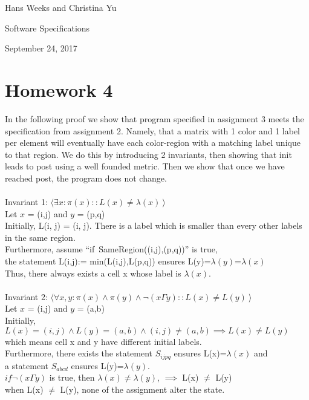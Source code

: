 \documentclass{article}
\begin{document}
\hfill Hans Weeks and Christina Yu

\hfill Software Specifications

\hfill September 24, 2017
\section*{Homework 4}
In the following proof we show that program specified in assignment 3 meets the specification from assignment 2. Namely, that a matrix with 1 color and 1 label per element will eventually have each color-region with a matching label unique to that region. We do this by introducing 2 invariants, then showing that init leads to post using a well founded metric. Then we show that once we have reached post, the program does not change.\\
\\
Invariant 1: $\langle \exists x: \pi(x) :: L(x) \neq \lambda(x) \ \rangle$ \\
Let $x$ = (i,j)  and $y$ = (p,q)\\
Initially, L(i, j) = (i, j). There is a label which is smaller than every other labels in the same region.\\
Furthermore, assume ``if\ SameRegion((i,j),(p,q))'' is true,\\
the statement L(i,j):= min(L(i,j),L(p,q)) ensures L(y)=$\lambda(y)$=$\lambda(x)$\\
Thus, there always exists a cell x whose label is $\lambda(x)$.\\
\\
Invariant 2: $\langle \forall x,y: \pi(x) \wedge \pi(y) \wedge \neg(x \Gamma y) :: L(x) \neq L(y) \ \rangle$ \\
Let $x$ = (i,j)  and $y$ = (a,b)\\
Initially, $L(x) = (i,j) \wedge L(y) = (a,b) \wedge (i,j)\neq(a,b) \implies L(x) \neq L(y)$\\
which means cell x and y have different initial labels.\\
Furthermore, there exists the statement $S_{ijpq}$ ensures L(x)=$\lambda(x)$ and\\a statement $S_{abcd}$ ensures L(y)=$\lambda(y)$.\\
$if \neg(x \Gamma y)$ is true, then $\lambda(x)$$\neq$$\lambda(y)$, $\implies$ L(x) $\neq$ L(y)\\
when L(x) $\neq$ L(y), none of the assignment alter the state.\\
\end{document}
